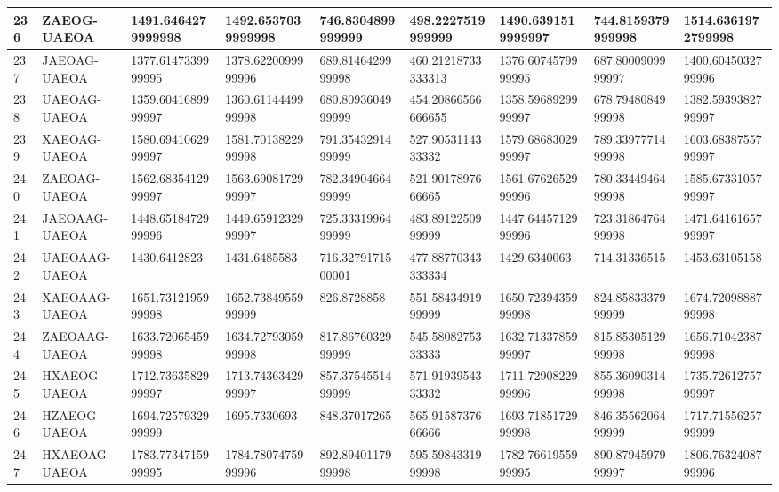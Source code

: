 {\begin{longtable}{|l|l|l|l|l|l|l|l|l|}
        236 & ZAEOG-UAEOA & 1491.6464279999998 & 1492.6537039999998 & 746.8304899999999 & 498.2227519999999 & 1490.6391519999997 & 744.8159379999998 & 1514.6361972799998 \\ \hline
        237 & JAEOAG-UAEOA & 1377.6147339999995 & 1378.6220099999996 & 689.8146429999998 & 460.21218733333313 & 1376.6074579999995 & 687.8000909999997 & 1400.6045032799996 \\ \hline
        238 & UAEOAG-UAEOA & 1359.6041689999997 & 1360.6114449999998 & 680.8093604999999 & 454.20866566666655 & 1358.5968929999997 & 678.7948084999998 & 1382.5939382799997 \\ \hline
        239 & XAEOAG-UAEOA & 1580.6941062999997 & 1581.7013822999998 & 791.3543291499999 & 527.9053114333332 & 1579.6868302999997 & 789.3397771499998 & 1603.6838755799997 \\ \hline
        240 & ZAEOAG-UAEOA & 1562.6835412999997 & 1563.6908172999997 & 782.3490466499999 & 521.9017897666665 & 1561.6762652999996 & 780.3344946499998 & 1585.6733105799997 \\ \hline
        241 & JAEOAAG-UAEOA & 1448.6518472999996 & 1449.6591232999997 & 725.3331996499999 & 483.8912250999999 & 1447.6445712999996 & 723.3186476499998 & 1471.6416165799997 \\ \hline
        242 & UAEOAAG-UAEOA & 1430.6412823 & 1431.6485583 & 716.3279171500001 & 477.88770343333334 & 1429.6340063 & 714.31336515 & 1453.63105158 \\ \hline
        243 & XAEOAAG-UAEOA & 1651.7312195999998 & 1652.7384955999999 & 826.8728858 & 551.5843491999999 & 1650.7239435999998 & 824.8583337999999 & 1674.7209888799998 \\ \hline
        244 & ZAEOAAG-UAEOA & 1633.7206545999998 & 1634.7279305999998 & 817.8676032999999 & 545.5808275333333 & 1632.7133785999997 & 815.8530512999998 & 1656.7104238799998 \\ \hline
        245 & HXAEOG-UAEOA & 1712.7363582999997 & 1713.7436342999997 & 857.3754551499999 & 571.9193954333332 & 1711.7290822999996 & 855.3609031499998 & 1735.7261275799997 \\ \hline
        246 & HZAEOG-UAEOA & 1694.7257932999999 & 1695.7330693 & 848.37017265 & 565.9158737666666 & 1693.7185172999998 & 846.3556206499999 & 1717.7155625799999 \\ \hline
        247 & HXAEOAG-UAEOA & 1783.7734715999995 & 1784.7807475999996 & 892.8940117999998 & 595.5984331999998 & 1782.7661955999995 & 890.8794597999997 & 1806.7632408799996 \\ \hline

\end{longtable}}

